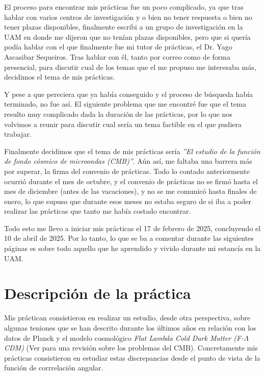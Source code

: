 \documentclass[12pt, a4paper]{article}
\theoremstyle{definition}
\begin{document}
El proceso para encontrar mis prácticas fue un poco complicado, ya que tras hablar con varios centros de investigación y o bien no tener respuesta o bien no tener plazas disponibles, finalmente escribi a un grupo de investigación en la UAM en donde me dijeron que no tenían plazas disponibles, pero que si quería podía hablar con el que finalmente fue mi tutor de prácticas, el Dr. Yago Ascasibar Sequeiros. Tras hablar con él, tanto por correo como de forma presencial, para discutir cual de los temas que el me propuso me interesaba más, decidimos el tema de mis prácticas.

Y pese a que pereciera que ya había conseguido y el proceso de búsqueda había terminado, no fue así. El siguiente problema que me encontré fue que el tema resulto muy complicado dada la duración de las prácticas, por lo que nos volvimos a reunir para discutir cual sería un tema factible en el que pudiera trabajar.

Finalmente decidimos que el tema de mis prácticas sería \textit{''El estudio de la función de fondo cósmico de microondas (CMB)''}. Aún así, me faltaba una barrera más por superar, la firma del convenio de prácticas. Todo lo contado anteriormente ocurrió durante el mes de octubre, y el convenio de prácticas no se firmó hasta el mes de diciembre (antes de las vacaciones), y no se me comunicó hasta finales de enero, lo que supuso que durante esos meses no estaba seguro de si iba a poder realizar las prácticas que tanto me había costado encontrar.

Todo esto me llevo a iniciar mis prácticas el 17 de febrero de 2025, concluyendo el 10 de abril de 2025. Por lo tanto, lo que se ba a comentar durante las siguientes páginas es sobre todo aquello que he aprendido y vivido durante mi estancía en la UAM.

\section{Descripción de la práctica}

Mis práctican consistieron en realizar un estudio, desde otra perspectiva, sobre algunas teniones que se han descrito durante los últimos años en relación con los datos de Planck y el modelo cosmológico \textit{Flat Lambda Cold Dark Matter (F-$\Lambda$CDM)} (Ver \autocite{ABDALLA202249} para una revisión sobre los problemas del CMB). Concretamente mis prácticas consistieron en estudiar estas discrepancias desde el punto de vista de la función de corrrelación angular.
\end{document}
